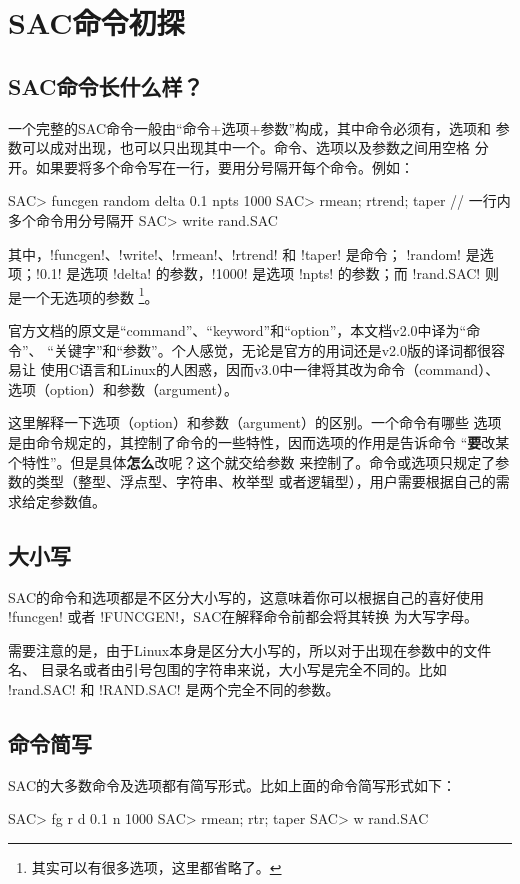 \section{SAC命令初探}
\subsection{SAC命令长什么样？}
一个完整的SAC命令一般由``命令+选项+参数''构成，其中命令必须有，选项和
参数可以成对出现，也可以只出现其中一个。命令、选项以及参数之间用空格
分开。如果要将多个命令写在一行，要用分号隔开每个命令。例如：
\begin{SACCode}
SAC> funcgen random delta 0.1 npts 1000
SAC> rmean; rtrend; taper                 // 一行内多个命令用分号隔开
SAC> write rand.SAC
\end{SACCode}
其中，!funcgen!、!write!、!rmean!、!rtrend! 和 !taper! 是命令；
!random! 是选项；!0.1! 是选项 !delta! 的参数，!1000! 是选项
!npts! 的参数；而 !rand.SAC! 则是一个无选项的参数
\footnote{其实可以有很多选项，这里都省略了。}。

\begin{note}
官方文档的原文是“command”、“keyword”和“option”，本文档v2.0中译为“命令”、
“关键字”和“参数”。个人感觉，无论是官方的用词还是v2.0版的译词都很容易让
使用C语言和Linux的人困惑，因而v3.0中一律将其改为命令（command）、
选项（option）和参数（argument）。

这里解释一下选项（option）和参数（argument）的区别。一个命令有哪些
选项是由命令规定的，其控制了命令的一些特性，因而选项的作用是告诉命令
“\textbf{要}改某个特性”。但是具体\textbf{怎么}改呢？这个就交给参数
来控制了。命令或选项只规定了参数的类型（整型、浮点型、字符串、枚举型
或者逻辑型），用户需要根据自己的需求给定参数值。
\end{note}

\subsection{大小写}
SAC的命令和选项都是不区分大小写的，这意味着你可以根据自己的喜好使用
!funcgen! 或者 !FUNCGEN!，SAC在解释命令前都会将其转换
为大写字母。

需要注意的是，由于Linux本身是区分大小写的，所以对于出现在参数中的文件名、
目录名或者由引号包围的字符串来说，大小写是完全不同的。比如 !rand.SAC!
和 !RAND.SAC! 是两个完全不同的参数。

\subsection{命令简写}
SAC的大多数命令及选项都有简写形式。比如上面的命令简写形式如下：
\begin{SACCode}
SAC> fg r d 0.1 n 1000
SAC> rmean; rtr; taper
SAC> w rand.SAC
\end{SACCode}

